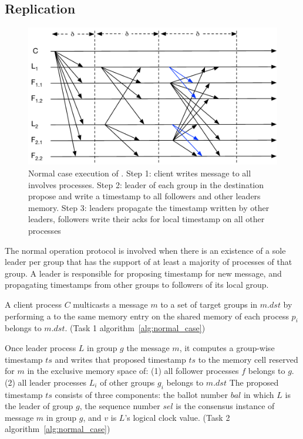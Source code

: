 \subsection{Replication}

\begin{figure}[ht!]
  \centering
  \includegraphics[width=1\linewidth]{figures/timeline-simple}
  \caption{Normal case execution of \libname. Step 1: client writes message to all
          involves processes. Step 2: leader of each group in the destination
          propose and write a timestamp to all followers and other leaders
          memory. Step 3: leaders propagate the timestamp written by other
          leaders, followers write their acks for local timestamp on all other
          processes}
  \label{fig:normal_operation_time}
\end{figure}



The normal operation protocol is involved when there is an existence of a sole
leader per group that has the support of at least a majority of processes of
that group. A leader is responsible for proposing timestamp for new message, and
propagating timestamps from other groups to followers of its local group.

A client process $C$ multicasts a message $m$ to a set of target groups in
$m.dst$ by performing a \rwrite to the same memory entry on the shared memory of
each process $p_i$ belongs to $m.dst$. (Task 1 algorithm~\ref{alg:normal_case})

Once leader process $L$ in group $g$ \lread the message $m$, it computes a
group-wise timestamp $ts$ and writes that proposed timestamp $ts$ to the memory
cell reserved for $m$ in the exclusive memory space of: (1) all follower
processes $f$ belongs to $g$. (2) all leader processes $L_i$ of other groups
$g_i$ belongs to $m.dst$ The proposed timestamp $ts$ consists of three
components: the ballot number $bal$ in which $L$ is the leader of group $g$, the
sequence number $sel$ is the consensus instance of message $m$ in group $g$, and
$v$ is $L$'s logical clock value. (Task 2 algorithm~\ref{alg:normal_case})

